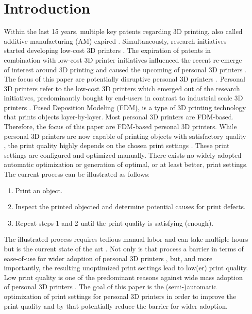 \section{Introduction}

Within the last 15 years, multiple key patents regarding 3D printing, also called additive manufacturing (AM) expired \cite{beaman2014additive, bechtold20163d, nuchitprasitchai2017factors}. Simultaneously, research initiatives started developing low-cost 3D printers \cite{beaman2014additive, bechtold20163d, nuchitprasitchai2017factors}. The expiration of patents in combination with low-cost 3D printer initiatives influenced the recent re-emerge of interest \cite{beaman2014additive} around 3D printing and caused the upcoming of personal 3D printers \cite{bechtold20163d}. The focus of this paper are potentially disruptive \cite{sauramo2014proliferation} personal 3D printers \cite{bechtold20163d}. Personal 3D printers refer to the low-cost 3D printers which emerged out of the research initiatives, predominantly bought by end-users in contrast to industrial scale 3D printers \cite{sauramo2014proliferation}. Fused Deposition Modeling (FDM), is a type of 3D printing technology that prints objects layer-by-layer. Most personal 3D printers are FDM-based. Therefore, the focus of this paper are FDM-based personal 3D printers. While personal 3D printers are now capable of printing objects with satisfactory quality \cite{gordeev2018improvement}, the print quality highly depends on the chosen print settings \cite{gordeev2018improvement, khan2020real, hernandez2015factors, jin2020automated}. These print settings are configured and optimized manually. There exists no widely adopted automatic optimization or generation of optimal, or at least better, print settings. The current process can be illustrated as follows: 

\begin{enumerate}
    \item 
    Print an object.
    
    \item
    Inspect the printed objected and determine potential causes for print defects. 
    
    \item
    Repeat steps 1 and 2 until the print quality is satisfying (enough).
\end{enumerate}

The illustrated process requires tedious manual labor and can take multiple hours but is the current state of the art \cite{khan2020real, hernandez2015factors}. Not only is that process a barrier in terms of ease-of-use for wider adoption of personal 3D printers \cite{sauramo2014proliferation}, but, and more importantly, the resulting unoptimized print settings lead to low(er) print quality. Low print quality is one of the predominant reasons against wide mass adoption of personal 3D printers \cite{sauramo2014proliferation, khan2020real, bechtold20163d, gordeev2018improvement, nuchitprasitchai2017factors}. The goal of this paper is the (semi-)automatic optimization of print settings for personal 3D printers in order to improve the print quality and by that potentially reduce the barrier for wider adoption.